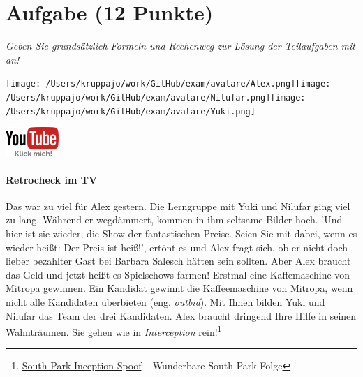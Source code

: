 \documentclass[a4paper, 9pt]{scrartcl}\usepackage[]{graphicx}\usepackage[]{xcolor}
\begin{document}
  
\clearpage

\section{Aufgabe \hfill (12 Punkte)}

\textit{Geben Sie grundsätzlich Formeln und Rechenweg zur Lösung der Teilaufgaben mit an!} \\[1Ex]
 

 
\ifcollection
\begin{flushright}
\tiny\vspace{-3Ex}
\textbf{\examinhaltstart}
\exammodulemathstat
\vspace{-4Ex}
\end{flushright}
\begin{minipage}[t]{0.5\textwidth}
\texttt{[image: /Users/kruppajo/work/GitHub/exam/avatare/Alex.png]}\hspace{-4mm}\texttt{[image: /Users/kruppajo/work/GitHub/exam/avatare/Nilufar.png]}\hspace{-4mm}\texttt{[image: /Users/kruppajo/work/GitHub/exam/avatare/Yuki.png]}
\end{minipage}
\begin{minipage}[t]{0.5\textwidth}
\hfill
\href{https://youtu.be/8Pb2sKUIMyk}{\includegraphics[width = 2cm]{img/youtube}}
\end{minipage}
\fi



\ifcollection
\paragraph{Retrocheck im TV}
\fi




Das war zu viel für Alex gestern. Die Lerngruppe mit Yuki und Nilufar ging viel zu lang. Während er wegdämmert, kommen in ihm seltsame Bilder hoch. 'Und hier ist sie wieder, die Show der fantastischen Preise. Seien Sie mit dabei, wenn es wieder heißt: Der Preis ist heiß!', ertönt es und Alex fragt sich, ob er nicht doch lieber bezahlter Gast bei Barbara Salesch hätten sein sollten. Aber Alex braucht das Geld und jetzt heißt es Spielschows farmen! Erstmal eine Kaffemaschine von Mitropa gewinnen. Ein Kandidat gewinnt die Kaffeemaschine von Mitropa, wenn nicht alle Kandidaten überbieten (eng. \textit{outbid}). Mit Ihnen bilden Yuki und Nilufar das Team der drei Kandidaten. Alex braucht dringend Ihre Hilfe in seinen Wahnträumen. Sie gehen wie in \textit{Interception} rein!\footnote{\href{https://www.youtube.com/watch?v=3RhxyHMs-w8}{South Park Inception Spoof} -- Wunderbare South Park Folge}
\end{document}
